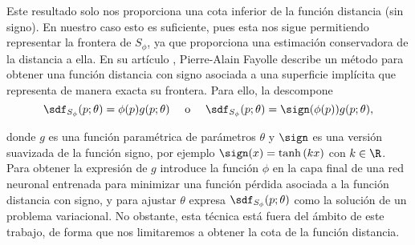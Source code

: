 Este resultado solo nos proporciona una cota inferior de la función distancia (sin signo). En nuestro caso esto es suficiente, pues esta nos sigue permitiendo representar la frontera de $S_{\phi}$, ya que proporciona una estimación conservadora de la distancia a ella. En su artículo \cite{art:impSdf}, Pierre-Alain Fayolle describe un método para obtener una función distancia con signo asociada a una superficie implícita que representa de manera exacta su frontera. Para ello, la descompone 
\begin{equation*}
    \sdf_{S_{\phi}}(p;\theta) = \phi(p)g(p;\theta)\quad \text{ o }\quad \sdf_{S_{\phi}}(p;\theta) = \sign(\phi(p))g(p;\theta),
\end{equation*}

donde $g$ es una función paramétrica de parámetros $\theta$ y $\sign$ es una versión suavizada de la función signo, por ejemplo $\sign(x) = \tanh{(kx)}$ con $k\in\R$. Para obtener la expresión de $g$ introduce la función $\phi$ en la capa final de una red neuronal entrenada para  minimizar una función pérdida asociada a la función distancia con signo, y para ajustar $\theta$ expresa $\sdf_{S_{\phi}}(p;\theta)$ como la solución de un problema variacional. No obstante, esta técnica está fuera del ámbito de este trabajo, de forma que nos limitaremos a obtener la cota de la función distancia.